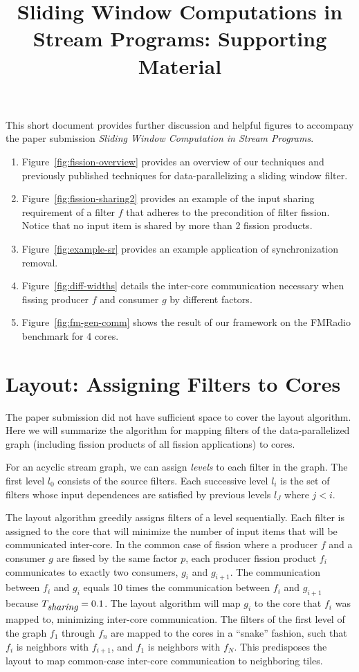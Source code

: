 \documentclass[]{article}
\newcommand{\mt}[1]{\mbox{\it #1}}
\begin{document}
\title{Sliding Window Computations in Stream Programs: Supporting Material}

\maketitle

This short document provides further discussion and helpful figures to accompany the paper submission {\it Sliding Window Computation in Stream Programs}.  
\begin{enumerate}
\item Figure~\ref{fig:fission-overview} provides an overview of our techniques and previously published techniques for data-parallelizing a sliding window filter.
\item Figure~\ref{fig:fission-sharing2} provides an example of the input sharing requirement of a filter $f$ that adheres to the precondition of filter fission.  Notice that no input item is shared by more than 2 fission products.
\item Figure~\ref{fig:example-sr} provides an example application of synchronization removal.
\item  Figure~\ref{fig:diff-widths} details the inter-core communication necessary when fissing producer $f$ and consumer $g$ by different factors. 
\item  Figure~\ref{fig:fm-gen-comm} shows the result of our framework on the FMRadio benchmark for 4 cores.
\end{enumerate}

\section{Layout: Assigning Filters to Cores}
The paper submission did not have sufficient space to cover the layout algorithm.  Here we will summarize the algorithm for mapping filters of the data-parallelized graph (including fission products of all fission applications) to cores.  

For an acyclic stream graph, we can assign {\it levels} to each filter in the graph.  The first level $l_0$ consists of the source filters.  Each successive level $l_i$ is the set of filters whose input dependences are satisfied by previous levels $l_J$ where $j < i$.

The layout algorithm greedily assigns filters of a level sequentially. Each filter is assigned to the core that will minimize the number of input items that will be communicated inter-core. In the common case of fission where a producer $f$ and a consumer $g$ are fissed by the same factor $p$, each producer fission product $f_i$ communicates to exactly two consumers, $g_i$ and $g_{i+1}$. The communication between $f_i$ and $g_i$ equals 10 times the communication between $f_i$ and $g_{i+1}$ because $T_{\mt{sharing}} = 0.1$. The layout algorithm will map $g_i$ to the core that $f_i$ was mapped to, minimizing inter-core communication. The filters of the first level of the graph $f_1$ through $f_n$ are mapped to the cores in a ``snake'' fashion, such that $f_i$ is neighbors with $f_{i+1}$, and $f_1$ is neighbors with $f_N$. This predisposes the layout to map common-case inter-core communication to neighboring tiles.
\end{document}
